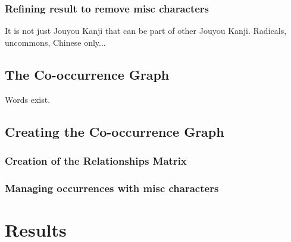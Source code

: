 \subsubsection{Refining result to remove misc characters}
It is not just Jouyou Kanji that can be part of other Jouyou Kanji. Radicals, uncommons, Chinese only...

\subsection{The Co-occurrence Graph}
Words exist.
\subsection{Creating the Co-occurrence Graph}
\subsubsection{Creation of the Relationships Matrix}
\subsubsection{Managing occurrences with misc characters}

\section{Results}